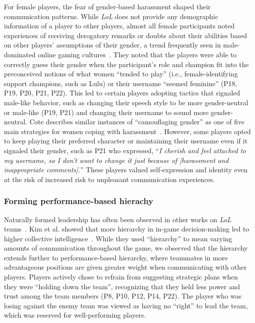 For female players, the fear of gender-based harassment shaped their communication patterns. While \textit{LoL} does not provide any demographic information of a player to other players, almost all female participants noted experiences of receiving derogatory remarks or doubts about their abilities based on other players' assumptions of their gender, a trend frequently seen in male-dominated online gaming cultures~\cite{fox2016women, norris2004gender, mclean2019female}. They noted that the players were able to correctly guess their gender when the participant's role and champion fit into the preconceived notions of what women ``tended to play'' (i.e., female-identifying support champions, such as Lulu) or their username ``seemed feminine'' (P18, P19, P20, P21, P22). This led to certain players adopting tactics that signaled male-like behavior, such as changing their speech style to be more gender-neutral or male-like (P19, P21) and changing their username to sound more gender-neutral. Cote describes similar instances of ``camouflaging gender'' as one of five main strategies for women coping with harassment~\cite{cote2017coping}. However, some players opted to keep playing their preferred character or maintaining their username even if it signaled their gender, such as P21 who expressed, ``\textit{I cherish and feel attached to my username, so I don’t want to change it just because of [harassment and inappropriate comments].}'' These players valued self-expression and identity even at the risk of increased risk to unpleasant communication experiences.


\subsubsection{Forming performance-based hierachy}
Naturally formed leadership has often been observed in other works on \textit{LoL} teams~\cite{kou2014}. Kim et al. showed that more hierarchy in in-game decision-making led to higher collective intelligence~\cite{kim2017}. While they used ``hierarchy'' to mean varying amounts of communication throughout the game, we observed that the hierarchy extends further to performance-based hierarchy, where teammates in more advantageous positions are given greater weight when communicating with other players. Players actively chose to refrain from suggesting strategic plans when they were ``holding down the team'', recognizing that they held less power and trust among the team members (P8, P10, P12, P14, P22). The player who was losing against the enemy team was viewed as having no ``right'' to lead the team, which was reserved for well-performing players.


